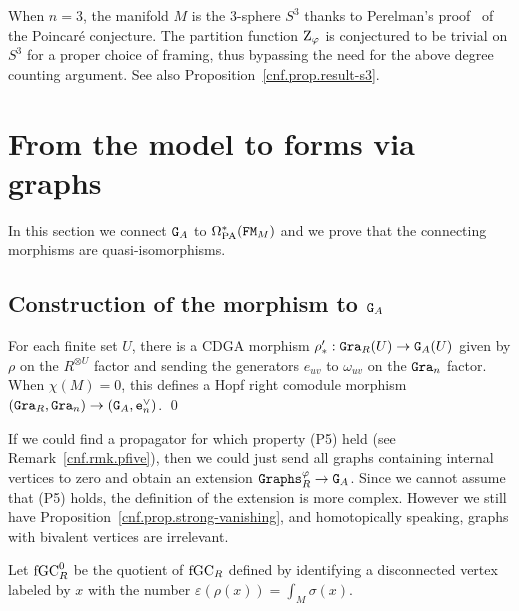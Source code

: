 \begin{remark}
  When $n = 3$, the manifold $M$ is the $3$-sphere $S^{3}$ thanks to Perelman's proof~\cite{Perelman2002,Perelman2003} of the Poincaré conjecture.
  The partition function $\mathrm{Z}_{\varphi}$ is conjectured to be trivial on $S^{3}$ for a proper choice of framing, thus bypassing the need for the above degree counting argument.
  See also Proposition~\ref{cnf.prop.result-s3}.
\end{remark}


\section{From the model to forms via graphs}
\label{cnf.sec.proof-theorem}

In this section we connect $\mathtt{G}_{A}$ to $\Omega_{\mathrm{PA}}^{*}(\mathtt{FM}_{M})$ and we prove that the connecting morphisms are quasi-isomorphisms.

\subsection{Construction of the morphism to \texorpdfstring{$\mathtt{G}_{A}$}{G\_A}}
\label{cnf.sec.constr-graphs_n-to}

\begin{proposition}
  \label{cnf.prop.gra-r-g-a}
  For each finite set $U$, there is a CDGA morphism $\rho'_{*} : \mathtt{Gra}_{R}(U) \to \mathtt{G}_{A}(U)$ given by $\rho$ on the $R^{\otimes U}$ factor and sending the generators $e_{uv}$ to $\omega_{uv}$ on the $\mathtt{Gra}_{n}$ factor.
  When $\chi(M) = 0$, this defines a Hopf right comodule morphism $(\mathtt{Gra}_{R}, \mathtt{Gra}_{n}) \to (\mathtt{G}_{A}, \mathtt{e}_{n}^{\vee})$.
  \qed
\end{proposition}

If we could find a propagator for which property (P5) held (see Remark~\ref{cnf.rmk.pfive}), then we could just send all graphs containing internal vertices to zero and obtain an extension $\mathtt{Graphs}^{\varphi}_{R} \to \mathtt{G}_{A}$.
Since we cannot assume that (P5) holds, the definition of the extension is more complex.
However we still have Proposition~\ref{cnf.prop.strong-vanishing}, and homotopically speaking, graphs with bivalent vertices are irrelevant.

\begin{definition}
  Let $\mathrm{fGC}^{0}_{R}$ be the quotient of $\mathrm{fGC}_{R}$ defined by identifying a disconnected vertex labeled by $x$ with the number $\varepsilon(\rho(x)) = \int_{M} \sigma(x)$.
\end{definition}

